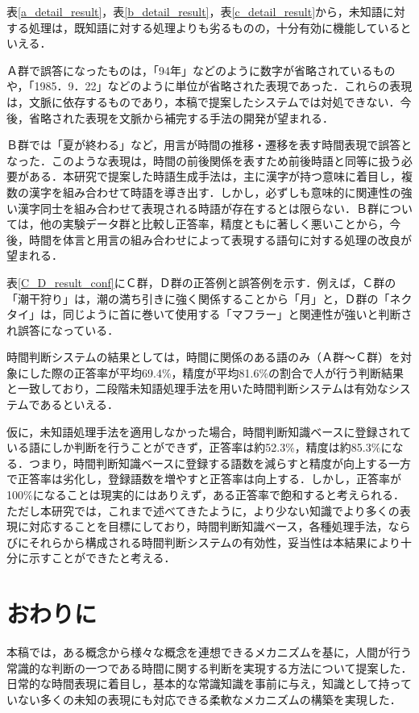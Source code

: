 表\ref{a_detail_result}，表\ref{b_detail_result}，表\ref{c_detail_result}から，未知語に対する処理は，既知語に対する処理よりも劣るものの，十分有効に機能しているといえる．


Ａ群で誤答になったものは，「94年」などのように数字が省略されているものや，「1985．9．22」などのように単位が省略された表現であった．これらの表現は，文脈に依存するものであり，本稿で提案したシステムでは対処できない．今後，省略された表現を文脈から補完する手法の開発が望まれる．

Ｂ群では「夏が終わる」など，用言が時間の推移・遷移を表す時間表現で誤答となった．このような表現は，時間の前後関係を表すため前後時語と同等に扱う必要がある．本研究で提案した時語生成手法は，主に漢字が持つ意味に着目し，複数の漢字を組み合わせて時語を導き出す．しかし，必ずしも意味的に関連性の強い漢字同士を組み合わせて表現される時語が存在するとは限らない．Ｂ群については，他の実験データ群と比較し正答率，精度ともに著しく悪いことから，今後，時間を体言と用言の組み合わせによって表現する語句に対する処理の改良が望まれる．

表\ref{C_D_result_conf}にＣ群，Ｄ群の正答例と誤答例を示す．例えば，Ｃ群の「潮干狩り」は，潮の満ち引きに強く関係することから「月」と，Ｄ群の「ネクタイ」は，同じように首に巻いて使用する「マフラー」と関連性が強いと判断され誤答になっている．

時間判断システムの結果としては，時間に関係のある語のみ（Ａ群〜Ｃ群）を対象にした際の正答率が平均69.4\%，精度が平均81.6\%の割合で人が行う判断結果と一致しており，二段階未知語処理手法を用いた時間判断システムは有効なシステムであるといえる．

仮に，未知語処理手法を適用しなかった場合，時間判断知識ベースに登録されている語にしか判断を行うことができず，正答率は約52.3\%，精度は約85.3\%になる．つまり，時間判断知識ベースに登録する語数を減らすと精度が向上する一方で正答率は劣化し，登録語数を増やすと正答率は向上する．しかし，正答率が100\%になることは現実的にはありえず，ある正答率で飽和すると考えられる．ただし本研究では，これまで述べてきたように，より少ない知識でより多くの表現に対応することを目標にしており，時間判断知識ベース，各種処理手法，ならびにそれらから構成される時間判断システムの有効性，妥当性は本結果により十分に示すことができたと考える．


\section{おわりに}
本稿では，ある概念から様々な概念を連想できるメカニズムを基に，人間が行う常識的な判断の一つである時間に関する判断を実現する方法について提案した．日常的な時間表現に着目し，基本的な常識知識を事前に与え，知識として持っていない多くの未知の表現にも対応できる柔軟なメカニズムの構築を実現した．

